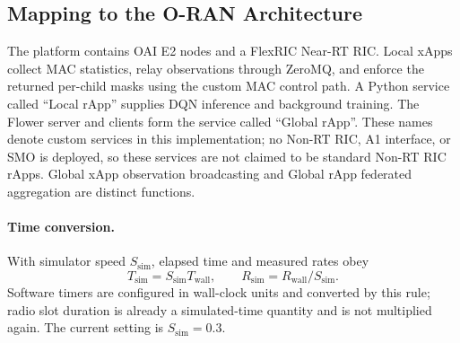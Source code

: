 \begin{EnChapter}
\section{Mapping to the O-RAN Architecture}
\label{subsec:oran}

The platform contains OAI E2 nodes and a FlexRIC Near-RT RIC. Local xApps collect
MAC statistics, relay observations through ZeroMQ, and enforce the returned
per-child masks using the custom MAC control path. A Python service called
``Local rApp'' supplies DQN inference and background training. The Flower server
and clients form the service called ``Global rApp''. These names denote custom
services in this implementation; no Non-RT RIC, A1 interface, or SMO is deployed,
so these services are not claimed to be standard Non-RT RIC rApps. Global xApp
observation broadcasting and Global rApp federated aggregation are distinct
functions.

\paragraph{Time conversion.}
With simulator speed $S_{\mathrm{sim}}$, elapsed time and measured rates obey
\begin{equation}
  T_{\mathrm{sim}}=S_{\mathrm{sim}}T_{\mathrm{wall}},\qquad
  R_{\mathrm{sim}}=R_{\mathrm{wall}}/S_{\mathrm{sim}}.
  \label{eq:sim-time}
\end{equation}
Software timers are configured in wall-clock units and converted by this rule;
radio slot duration is already a simulated-time quantity and is not multiplied
again. The current setting is $S_{\mathrm{sim}}=0.3$.


\end{EnChapter}
